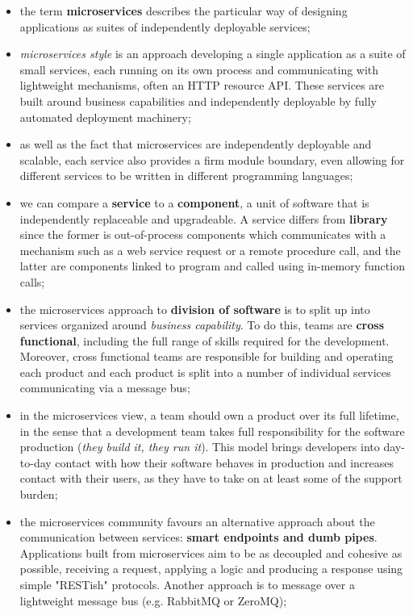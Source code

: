\documentclass[oneside]{article}
\begin{document}
\begin{itemize}
    \item the term \textbf{microservices} describes the particular way of designing applications as suites of independently deployable services;
    
    \item \textit{microservices style} is an approach developing a single application as a suite of small services, each running on its own process and communicating with lightweight mechanisms, often an HTTP resource API. These services are built around business capabilities and independently deployable by fully automated deployment machinery;
    
     \item as well as the fact that microservices are independently deployable and scalable, each service also provides a firm module boundary, even allowing for different services to be written in different programming languages;
     
     \item we can compare a \textbf{service} to a \textbf{component}, a unit of software that is independently replaceable and upgradeable. A service differs from \textbf{library} since the former is out-of-process components which communicates with a mechanism such as a web service request or a remote procedure call, and the latter are components linked to program and called using in-memory function calls;
        
    \item the microservices approach to \textbf{division of software} is to split up into services organized around \textit{business capability}. To do this, teams are \textbf{cross functional}, including the full range of skills required for the development. Moreover, cross functional teams are responsible for building and operating each product and each product is split into a number of individual services communicating via a message bus;
    
    \item in the microservices view, a team should own a product over its full lifetime, in the sense that a development team takes full responsibility for the software production (\textit{they build it, they run it}). This model brings developers into day-to-day contact with how their software behaves in production and increases contact with their users, as they have to take on at least some of the support burden;
    
    \item the microservices community favours an alternative approach about the communication between services: \textbf{smart endpoints and dumb pipes}. Applications built from microservices aim to be as decoupled and cohesive as possible, receiving a request, applying a logic and producing a response using simple "RESTish" protocols. Another approach is to message over a lightweight message bus (e.g. RabbitMQ or ZeroMQ);
    

\end{itemize}
\end{document}
